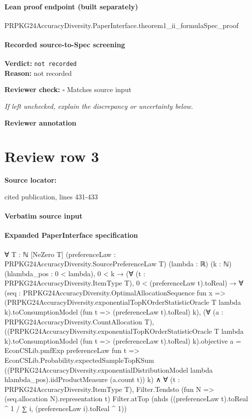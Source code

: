 \documentclass[10pt]{article}
\newcommand{\reviewerbox}{%
  \par\noindent\fbox{\parbox{0.96\linewidth}{\rule{0pt}{0.38in}}}\par
}
\newcommand{\reviewmatch}[1]{%
  \par\noindent\textbf{Reviewer check:} $\square$\; #1\par
  \noindent\emph{If left unchecked, explain the discrepancy or uncertainty below.}\par
}
\begin{document}
\paragraph{Lean proof endpoint (built separately)}\begin{ReviewVerbatim}
PRPKG24AccuracyDiversity.PaperInterface.theorem1_ii_formulaSpec_proof
\end{ReviewVerbatim}

\paragraph{Recorded source-to-Spec screening}
\textbf{Verdict:} \texttt{not recorded}
\\
\textbf{Reason:} not recorded
\reviewmatch{Matches source input}
\noindent\textbf{Reviewer annotation}\par
\reviewerbox
\clearpage
\hypertarget{source-claim-378eee8a78b6ada4}{}
\section*{Review row 3}
\textbf{Source locator:} {\footnotesize\raggedright cited publication, lines 431-\allowbreak{}433\par}
\paragraph{Verbatim source input}
\begin{ReviewVerbatim}
\end{ReviewVerbatim}


\paragraph{Expanded PaperInterface specification}
\begin{ReviewVerbatim}
∀ {T : ℕ} [NeZero T] (preferenceLaw : PRPKG24AccuracyDiversity.SourcePreferenceLaw T) (lambda : ℝ) (k : ℕ)
  (hlambda_pos : 0 < lambda),
  0 < k →
    (∀ (t : PRPKG24AccuracyDiversity.ItemType T), 0 < (preferenceLaw t).toReal) →
      ∀
        (seq :
          PRPKG24AccuracyDiversity.OptimalAllocationSequence fun x =>
            (PRPKG24AccuracyDiversity.exponentialTopKOrderStatisticOracle T lambda k).toConsumptionModel
              (fun t => (preferenceLaw t).toReal) k),
        (∀ (a : PRPKG24AccuracyDiversity.CountAllocation T),
            ((PRPKG24AccuracyDiversity.exponentialTopKOrderStatisticOracle T lambda k).toConsumptionModel
                    (fun t => (preferenceLaw t).toReal) k).objective
                a =
              EconCSLib.pmfExp preferenceLaw fun t =>
                EconCSLib.Probability.expectedSampleTopKSum
                  ((PRPKG24AccuracyDiversity.exponentialDistributionModel lambda hlambda_pos).iidProductMeasure
                    (a.count t))
                  k) ∧
          ∀ (t : PRPKG24AccuracyDiversity.ItemType T),
            Filter.Tendsto (fun N => (seq.allocation N).representation t) Filter.atTop
              (nhds ((preferenceLaw t).toReal ^ 1 / ∑ i, (preferenceLaw i).toReal ^ 1))
\end{ReviewVerbatim}
\end{document}
